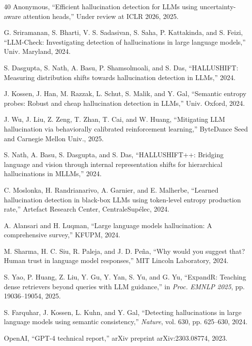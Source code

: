 \documentclass{article}
\begin{document}
\begin{thebibliography}{40}
Anonymous,
``Efficient hallucination detection for LLMs using uncertainty-aware attention heads,''
Under review at ICLR 2026, 2025.

G. Sriramanan, S. Bharti, V. S. Sadasivan, S. Saha, P. Kattakinda, and S. Feizi,
``LLM-Check: Investigating detection of hallucinations in large language models,''
Univ. Maryland, 2024.

S. Dasgupta, S. Nath, A. Basu, P. Shamsolmoali, and S. Das,
``HALLUSHIFT: Measuring distribution shifts towards hallucination detection in LLMs,'' 2024.

J. Kossen, J. Han, M. Razzak, L. Schut, S. Malik, and Y. Gal,
``Semantic entropy probes: Robust and cheap hallucination detection in LLMs,''
Univ. Oxford, 2024.

J. Wu, J. Liu, Z. Zeng, T. Zhan, T. Cai, and W. Huang,
``Mitigating LLM hallucination via behaviorally calibrated reinforcement learning,''
ByteDance Seed and Carnegie Mellon Univ., 2025.

S. Nath, A. Basu, S. Dasgupta, and S. Das,
``HALLUSHIFT++: Bridging language and vision through internal representation shifts for hierarchical hallucinations in MLLMs,'' 2024.

C. Moslonka, H. Randrianarivo, A. Garnier, and E. Malherbe,
``Learned hallucination detection in black-box LLMs using token-level entropy production rate,''
Artefact Research Center, CentraleSup\'{e}lec, 2024.

A. Alansari and H. Luqman,
``Large language models hallucination: A comprehensive survey,''
KFUPM, 2024.

M. Sharma, H. C. Siu, R. Paleja, and J. D. Pe\~{n}a,
``Why would you suggest that? Human trust in language model responses,''
MIT Lincoln Laboratory, 2024.

S. Yao, P. Huang, Z. Liu, Y. Gu, Y. Yan, S. Yu, and G. Yu,
``ExpandR: Teaching dense retrievers beyond queries with LLM guidance,''
in \textit{Proc. EMNLP 2025}, pp. 19036--19054, 2025.

S. Farquhar, J. Kossen, L. Kuhn, and Y. Gal,
``Detecting hallucinations in large language models using semantic consistency,''
\textit{Nature}, vol. 630, pp. 625--630, 2024.

OpenAI,
``GPT-4 technical report,''
arXiv preprint arXiv:2303.08774, 2023.


\end{thebibliography}
\end{document}
